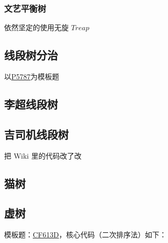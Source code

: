 \documentclass[12pt]{article}
\begin{document}


\newpage

\subsubsection{文艺平衡树}

依然坚定的使用无旋 $Treap$



\newpage

\subsection{线段树分治}

以\href{https://www.luogu.com.cn/problem/P5787}{P5787}为模板题



\newpage

\subsection{李超线段树}



\newpage

\subsection{吉司机线段树}

把 Wiki 里的代码改了改



\newpage

\subsection{猫树}



\newpage

\subsection{虚树}

模板题：\href{https://codeforces.com/problemset/problem/613/D}{CF613D}，核心代码（二次排序法）如下：
\end{document}
